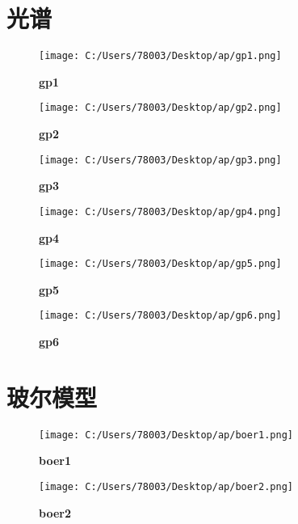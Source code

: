 \documentclass[UTF8]{report}
\theoremstyle{MyLineTheoremStyle} %
\theoremstyle{MyBlockTheoremStyle} %
\theoremstyle{MySubsubsectionStyle} %
\begin{document}
\cleardoublepage
\section{光谱}

\begin{figure}[ht]
    \centering
    \texttt{[image: C:/Users/78003/Desktop/ap/gp1.png]}
    \caption{\textbf{gp1}}
    \label{fig:gp1}
\end{figure}

\begin{figure}[ht]
    \centering
    \texttt{[image: C:/Users/78003/Desktop/ap/gp2.png]}
    \caption{\textbf{gp2}}
    \label{fig:gp2}
\end{figure}

\begin{figure}[ht]
    \centering
    \texttt{[image: C:/Users/78003/Desktop/ap/gp3.png]}
    \caption{\textbf{gp3}}
    \label{fig:gp3}
\end{figure}

\begin{figure}[ht]
    \centering
    \texttt{[image: C:/Users/78003/Desktop/ap/gp4.png]}
    \caption{\textbf{gp4}}
    \label{fig:gp4}
\end{figure}

\begin{figure}[ht]
    \centering
    \texttt{[image: C:/Users/78003/Desktop/ap/gp5.png]}
    \caption{\textbf{gp5}}
    \label{fig:gp5}
\end{figure}

\begin{figure}[ht]
    \centering
    \texttt{[image: C:/Users/78003/Desktop/ap/gp6.png]}
    \caption{\textbf{gp6}}
    \label{fig:gp6}
\end{figure}

\cleardoublepage
\section{玻尔模型}

\begin{figure}[ht]
    \centering
    \texttt{[image: C:/Users/78003/Desktop/ap/boer1.png]}
    \caption{\textbf{boer1}}
    \label{fig:boer1}
\end{figure}

\begin{figure}[ht]
    \centering
    \texttt{[image: C:/Users/78003/Desktop/ap/boer2.png]}
    \caption{\textbf{boer2}}
    \label{fig:boer2}
\end{figure}
\end{document}
